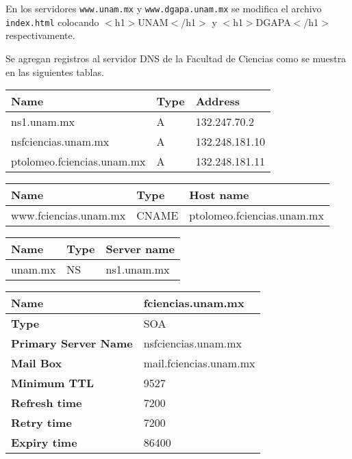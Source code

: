\documentclass{article}
\begin{document}
En los servidores \texttt{www.unam.mx} y \texttt{www.dgapa.unam.mx} se modifica el archivo \texttt{index.html} colocando $<$h1$>$UNAM$<$/h1$>$ y $<$h1$>$DGAPA$<$/h1$>$ respectivamente.

Se agregan registros al servidor DNS de la Facultad de Ciencias como se muestra en las siguientes tablas.

\begin{center}
\begin{tabular}{|l|l|l|}
\hline
\textbf{Name} & \textbf{Type} & \textbf{Address} \\ \hline
ns1.unam.mx & A & 132.247.70.2 \\ \hline
nsfciencias.unam.mx & A & 132.248.181.10 \\ \hline
ptolomeo.fciencias.unam.mx & A & 132.248.181.11 \\ \hline
\end{tabular}
\end{center}

\begin{center}
\begin{tabular}{|l|l|l|}
\hline
\textbf{Name} & \textbf{Type} & \textbf{Host name} \\ \hline
www.fciencias.unam.mx & CNAME & ptolomeo.fciencias.unam.mx \\ \hline
\end{tabular}
\end{center}

\begin{center}
\begin{tabular}{|l|l|l|}
\hline
\textbf{Name} & \textbf{Type} & \textbf{Server name} \\ \hline
unam.mx & NS & ns1.unam.mx \\ \hline
\end{tabular}
\end{center}

\begin{center}
\begin{tabular}{|l|l|}
\hline
\textbf{Name} & fciencias.unam.mx \\ \hline
\textbf{Type} & SOA \\ \hline
\textbf{Primary Server Name} & nsfciencias.unam.mx \\ \hline
\textbf{Mail Box} & mail.fciencias.unam.mx \\ \hline
\textbf{Minimum TTL} & 9527 \\ \hline
\textbf{Refresh time} & 7200 \\ \hline
\textbf{Retry time} & 7200 \\ \hline
\textbf{Expiry time} & 86400 \\ \hline
\end{tabular}
\end{center}
\end{document}
